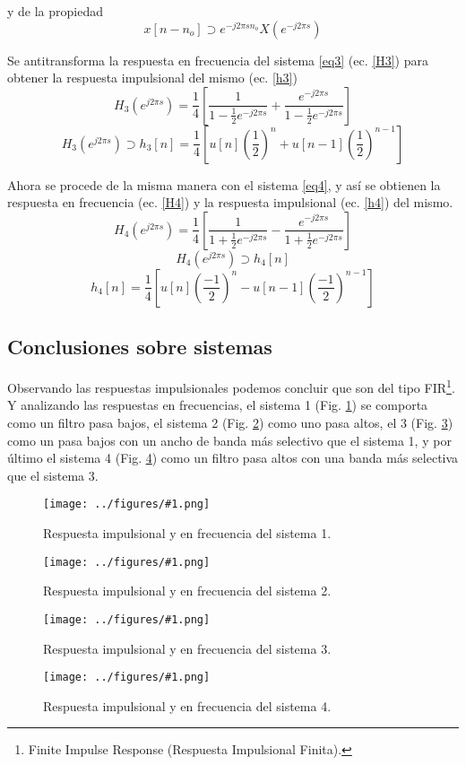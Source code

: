 \documentclass[letterpaper, 10 pt, conference]{ieeeconf}  %
\newcommand{\image}[2] {
  \begin{figure}[H]
    \centering
    \texttt{[image: ../figures/\#1.png]}
    \caption{#2}
    \label{fig:#1}
  \end{figure}
}
\begin{document}
y de la propiedad
\begin{equation*}
  x[n-n_o] \supset e^{-j2{\pi}sn_o}X(e^{-j2{\pi}s})
\end{equation*}

Se antitransforma la respuesta en frecuencia del sistema \ref{eq3} (ec. \ref{H3}) para obtener la respuesta impulsional del mismo (ec. \ref{h3})
\begin{equation*}
  H_3(e^{j2{\pi}s}) = \frac{1}{4}[\frac{1}{1 - \frac{1}{2}e^{-j2{\pi}s}} + \frac{e^{-j2{\pi}s}}{1 - \frac{1}{2}e^{-j2{\pi}s}}]
\end{equation*}
\begin{equation} \label{h3}
  H_3(e^{j2{\pi}s}) \supset h_3[n] = \frac{1}{4} [ u[n](\frac{1}{2})^n + u[n-1](\frac{1}{2})^{n-1} ]
\end{equation}

Ahora se procede de la misma manera con el sistema \ref{eq4}, y as\'i se obtienen la respuesta en frecuencia (ec. \ref{H4}) y la respuesta impulsional (ec. \ref{h4}) del mismo.
\begin{equation} \label{H4}
  H_4(e^{j2{\pi}s}) = \frac{1}{4}[ \frac{1}{1+\frac{1}{2}e^{-j2{\pi}s}} - \frac{e^{-j2{\pi}s}}{1+\frac{1}{2}e^{-j2{\pi}s}} ]
\end{equation}
\begin{equation*}
  H_4(e^{j2{\pi}s}) \supset h_4[n]
\end{equation*}
\begin{equation} \label{h4}
  h_4[n] = \frac{1}{4} [ u[n](\frac{-1}{2})^n - u[n-1](\frac{-1}{2})^{n-1} ]
\end{equation}

\subsection{Conclusiones sobre sistemas}
Observando las respuestas impulsionales podemos concluir que son del tipo FIR\footnote{Finite Impulse Response (Respuesta Impulsional Finita).}. \\
Y analizando las respuestas en frecuencias, el sistema 1 (Fig. \ref{fig:resp_sist_1}) se comporta como un filtro pasa bajos, el sistema 2 (Fig. \ref{fig:resp_sist_2}) como uno pasa altos, el 3 (Fig. \ref{fig:resp_sist_3}) como un pasa bajos con un ancho de banda m\'as selectivo que el sistema 1, y por \'ultimo el sistema 4 (Fig. \ref{fig:resp_sist_4}) como un filtro pasa altos con una banda m\'as selectiva que el sistema 3.
\image{resp_sist_1}{Respuesta impulsional y en frecuencia del sistema 1.}
\image{resp_sist_2}{Respuesta impulsional y en frecuencia del sistema 2.}
\image{resp_sist_3}{Respuesta impulsional y en frecuencia del sistema 3.}
\image{resp_sist_4}{Respuesta impulsional y en frecuencia del sistema 4.}
\end{document}
